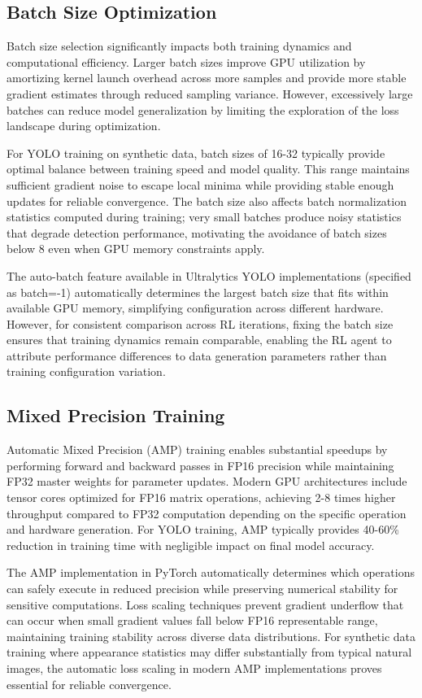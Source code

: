 \subsection{Batch Size Optimization}

Batch size selection significantly impacts both training dynamics and computational efficiency. Larger batch sizes improve GPU utilization by amortizing kernel launch overhead across more samples and provide more stable gradient estimates through reduced sampling variance. However, excessively large batches can reduce model generalization by limiting the exploration of the loss landscape during optimization.

For YOLO training on synthetic data, batch sizes of 16-32 typically provide optimal balance between training speed and model quality. This range maintains sufficient gradient noise to escape local minima while providing stable enough updates for reliable convergence. The batch size also affects batch normalization statistics computed during training; very small batches produce noisy statistics that degrade detection performance, motivating the avoidance of batch sizes below 8 even when GPU memory constraints apply.

The auto-batch feature available in Ultralytics YOLO implementations (specified as batch=-1) automatically determines the largest batch size that fits within available GPU memory, simplifying configuration across different hardware. However, for consistent comparison across RL iterations, fixing the batch size ensures that training dynamics remain comparable, enabling the RL agent to attribute performance differences to data generation parameters rather than training configuration variation.

\subsection{Mixed Precision Training}

Automatic Mixed Precision (AMP) training enables substantial speedups by performing forward and backward passes in FP16 precision while maintaining FP32 master weights for parameter updates. Modern GPU architectures include tensor cores optimized for FP16 matrix operations, achieving 2-8 times higher throughput compared to FP32 computation depending on the specific operation and hardware generation. For YOLO training, AMP typically provides 40-60\% reduction in training time with negligible impact on final model accuracy.

The AMP implementation in PyTorch automatically determines which operations can safely execute in reduced precision while preserving numerical stability for sensitive computations. Loss scaling techniques prevent gradient underflow that can occur when small gradient values fall below FP16 representable range, maintaining training stability across diverse data distributions. For synthetic data training where appearance statistics may differ substantially from typical natural images, the automatic loss scaling in modern AMP implementations proves essential for reliable convergence.

